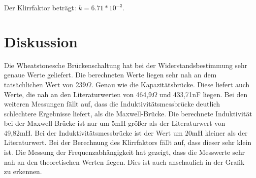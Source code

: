 Der Klirrfaktor beträgt: $k= 6.71*10^{-3}$.

\section{Diskussion}

Die Wheatstonesche Brückenschaltung hat bei der Widerstandsbestimmung sehr genaue Werte geliefert. Die berechneten Werte liegen sehr nah an dem tatsächlichen Wert von 239$\Omega$. Genau wie die Kapazitätsbrücke. Diese liefert auch Werte, die nah an den Literaturwerten von 464,9$\Omega$ und 433,71nF liegen. Bei den weiteren Messungen fällt auf, dass die Induktivitätsmessbrücke deutlich schlechtere Ergebnisse liefert, als die Maxwell-Brücke. Die berechnete Induktivität bei der Maxwell-Brücke ist nur um 5mH größer als der Literaturwert von 49,82mH. Bei der Induktivitätsmessbrücke ist der Wert um 20mH kleiner als der Literaturwert. Bei der Berechnung des Klirrfaktors fällt auf, dass dieser sehr klein ist. Die Messung der Frequenzabhängigkeit hat gezeigt, dass die Messwerte sehr nah an den theoretischen Werten liegen. Dies ist auch anschaulich in der Grafik zu erkennen.